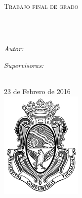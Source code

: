 \documentclass[
11pt, %
oneside, %
english, %
doublespacing, %
nolistspacing, %
parskip, %
parident,
headsepline, %
]{MastersDoctoralThesis} %
\author{Luis \textsc{Thur}} %
\begin{document}
\frontmatter %

\pagestyle{plain} %


\begin{titlepage}
\begin{center}
{\scshape\LARGE \univname \\ \Large{\facname} \par}\vspace{0.5cm} %
\textsc{\large Trabajo final de grado}\\[0.5cm] %

\HRule \\[0.4cm] %
{\huge \bfseries \ttitle\par}\vspace{0.4cm} %
\HRule \\[0.4cm] %
 
\begin{minipage}[t]{0.4\textwidth}
\begin{flushleft} \large
\emph{Autor:}\\
\authorname %
\end{flushleft}
\end{minipage}
\begin{minipage}[t]{0.4\textwidth}
\begin{flushright} \large
\emph{Supervisoras:} \\
\supname
\end{flushright}
\end{minipage}\\[1cm]
{23 de Febrero de 2016}\\[0.5cm] %
\includegraphics{figures/logo.jpg} %
 
\vfill
\end{center}
\end{titlepage}
\end{document}
